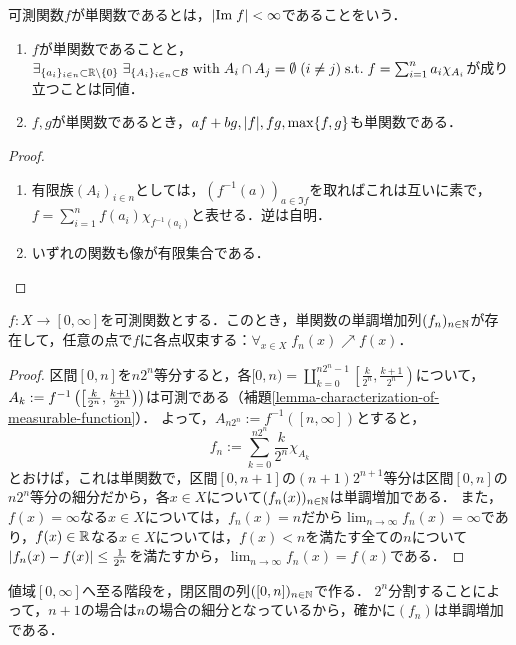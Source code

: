 \documentclass[uplatex, dvipdfmx]{jsreport}
\renewcommand{\B}{\mathcal{B}}
\begin{document}
\begin{definition}
    可測関数$f$が単関数であるとは，$\lvert\mathrm{Im}\; f\rvert<\infty$であることをいう．
\end{definition}

\begin{lemma}\mbox{}
    \begin{enumerate}
        \item $f$が単関数であることと，$\exists_{\{a_i\}_{i\in n}\subset\R\setminus\{0\}}\;\exists_{\{A_i\}_{i\in n}\subset\B}\;\mathrm{with}\;A_i\cap A_j=\emptyset\;(i\ne j)\st f=\sum_{i=1}^na_i\chi_{A_i}$が成り立つことは同値．
        \item $f,g$が単関数であるとき，$af+bg,\lvert f\rvert,fg,\max\{f,g\}$も単関数である．
    \end{enumerate}
\end{lemma}
\begin{proof}\mbox{}
    \begin{enumerate}
        \item 有限族$(A_i)_{i\in n}$としては，$(f^{-1}(a))_{a\in\Im f}$を取ればこれは互いに素で，$f=\sum^n_{i=1}f(a_i)\chi_{f^{-1}(a_i)}$と表せる．逆は自明．
        \item いずれの関数も像が有限集合である．
    \end{enumerate}
\end{proof}

\begin{theorem}[単関数近似]\label{thm-simple-function-approximation}
    $f:X\to[0,\infty]$を可測関数とする．このとき，単関数の単調増加列$(f_n)_{n\in\mathbb{N}}$が存在して，任意の点で$f$に各点収束する：$\forall_{x\in X}\;f_n(x)\nearrow f(x)$．
\end{theorem}
\begin{proof}
    区間$[0,n]$を$n2^n$等分すると，各$[0,n)=\coprod_{k=0}^{n2^n-1}\left[\frac{k}{2^n},\frac{k+1}{2^n}\right)$について，$A_k:=f^{-1}\left(\left[\frac{k}{2^n},\frac{k+1}{2^n}\right)\right)$は可測である（補題\ref{lemma-characterization-of-measurable-function}）．
    よって，$A_{n2^n}:=f^{-1}([n,\infty])$とすると，
    \[f_n:=\sum^{n2^n}_{k=0}\frac{k}{2^n}\chi_{A_k}\]
    とおけば，これは単関数で，区間$[0,n+1]$の$(n+1)2^{n+1}$等分は区間$[0,n]$の$n2^n$等分の細分だから，各$x\in X$について$(f_n(x))_{n\in\mathbb{N}}$は単調増加である．
    また，$f(x)=\infty$なる$x\in X$については，$f_n(x)=n$だから$\lim_{n\to\infty}f_n(x)=\infty$であり，$f(x)\in\mathbb{R}$なる$x\in X$については，$f(x)<n$を満たす全ての$n$について$\lvert f_n(x)-f(x)\rvert\le\frac{1}{2^n}$を満たすから，$\lim_{n\to\infty}f_n(x)=f(x)$である．
\end{proof}
\begin{remarks}
    値域$[0,\infty]$へ至る階段を，閉区間の列$([0,n])_{n\in\mathbb{N}}$で作る．
    $2^n$分割することによって，$n+1$の場合は$n$の場合の細分となっているから，確かに$(f_n)$は単調増加である．
\end{remarks}
\end{document}
